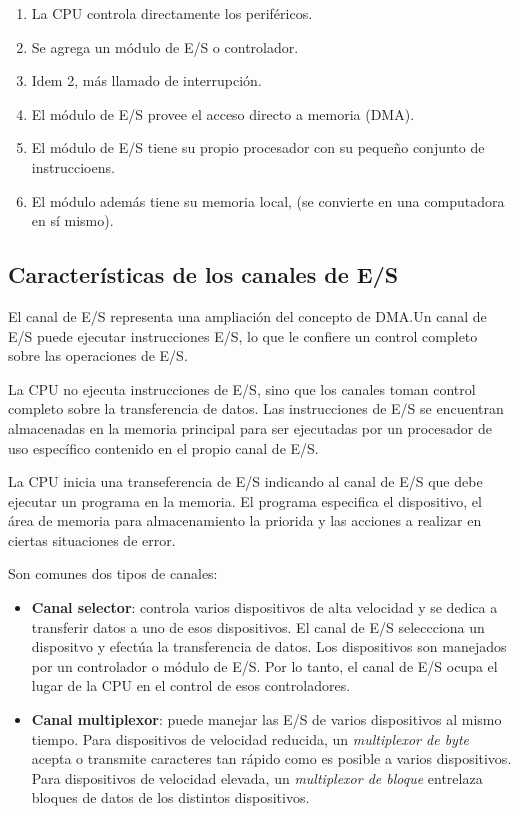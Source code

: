 \begin{enumerate}
  \item La CPU controla directamente los periféricos.
  \item Se agrega un módulo de E/S o controlador.
  \item Idem 2, más llamado de interrupción.
  \item El módulo de E/S provee el acceso directo a memoria (DMA).
  \item El módulo de E/S tiene su propio procesador con su pequeño conjunto de instruccioens.
  \item El módulo además tiene su memoria local, (se convierte en una computadora en sí mismo).
\end{enumerate}

\subsection*{Características de los canales de E/S}

El canal de E/S representa una ampliación del concepto de DMA.\@ Un canal de E/S puede ejecutar instrucciones E/S, lo que le confiere un control completo sobre las operaciones de E/S.

La CPU no ejecuta instrucciones de E/S, sino que los canales toman control completo sobre la transferencia de datos. Las instrucciones de E/S se encuentran almacenadas en la memoria principal para ser ejecutadas por un procesador de uso específico contenido en el propio canal de E/S.

La CPU inicia una transeferencia de E/S indicando al canal de E/S que debe ejecutar un programa en la memoria. El programa especifica el dispositivo, el área de memoria para almacenamiento la priorida y las acciones a realizar en ciertas situaciones de error.

Son comunes dos tipos de canales:

\begin{itemize}
  \item \textbf{Canal selector}: controla varios dispositivos de alta velocidad y se dedica a transferir datos a uno de esos dispositivos. El canal de E/S seleccciona un dispositvo y efectúa la transferencia de datos. Los dispositivos son manejados por un controlador o módulo de E/S. Por lo tanto, el canal de E/S ocupa el lugar de la CPU en el control de esos controladores.
  \item \textbf{Canal multiplexor}: puede manejar las E/S de varios dispositivos al mismo tiempo. Para dispositivos de velocidad reducida, un \textit{multiplexor de byte} acepta o transmite caracteres tan rápido como es posible a varios dispositivos. Para dispositivos de velocidad elevada, un \textit{multiplexor de bloque} entrelaza bloques de datos de los distintos dispositivos.
\end{itemize}